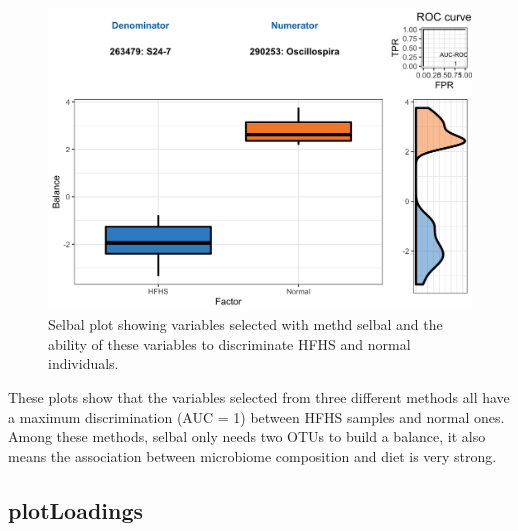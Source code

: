 \documentclass[openany]{book}
\begin{document}
\begin{figure}

{\centering \includegraphics[width=1\linewidth]{./Generated_plots/unnamed-chunk-26-1} 

}

\caption{Selbal plot showing variables selected with methd selbal and the ability of these variables to discriminate HFHS and normal individuals.}\label{fig:unnamed-chunk-26}
\end{figure}

These plots show that the variables selected from three different
methods all have a maximum discrimination (AUC = 1) between HFHS samples
and normal ones. Among these methods, selbal only needs two OTUs to
build a balance, it also means the association between microbiome
composition and diet is very strong.

\subsection{plotLoadings}\label{plotloadings-1}
\end{document}
